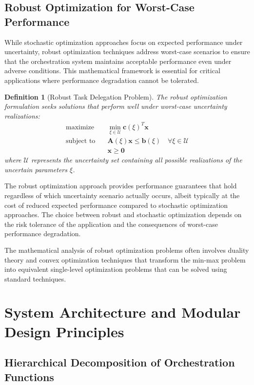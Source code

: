\documentclass[12pt,a4paper]{article}
\newtheorem{definition}[theorem]{Definition}
\begin{document}
\subsection{Robust Optimization for Worst-Case Performance}

While stochastic optimization approaches focus on expected performance under uncertainty, robust optimization techniques address worst-case scenarios to ensure that the orchestration system maintains acceptable performance even under adverse conditions. This mathematical framework is essential for critical applications where performance degradation cannot be tolerated.

\begin{definition}[Robust Task Delegation Problem]
The robust optimization formulation seeks solutions that perform well under worst-case uncertainty realizations:
\begin{align}
\text{maximize} \quad &\min_{\xi \in \mathcal{U}} \mathbf{c}(\xi)^T \mathbf{x} \\
\text{subject to} \quad &\mathbf{A}(\xi)\mathbf{x} \leq \mathbf{b}(\xi) \quad \forall \xi \in \mathcal{U} \\
&\mathbf{x} \geq \mathbf{0}
\end{align}
where $\mathcal{U}$ represents the uncertainty set containing all possible realizations of the uncertain parameters $\xi$.
\end{definition}

The robust optimization approach provides performance guarantees that hold regardless of which uncertainty scenario actually occurs, albeit typically at the cost of reduced expected performance compared to stochastic optimization approaches. The choice between robust and stochastic optimization depends on the risk tolerance of the application and the consequences of worst-case performance degradation.

The mathematical analysis of robust optimization problems often involves duality theory and convex optimization techniques that transform the min-max problem into equivalent single-level optimization problems that can be solved using standard techniques.

\section{System Architecture and Modular Design Principles}

\subsection{Hierarchical Decomposition of Orchestration Functions}
\end{document}
